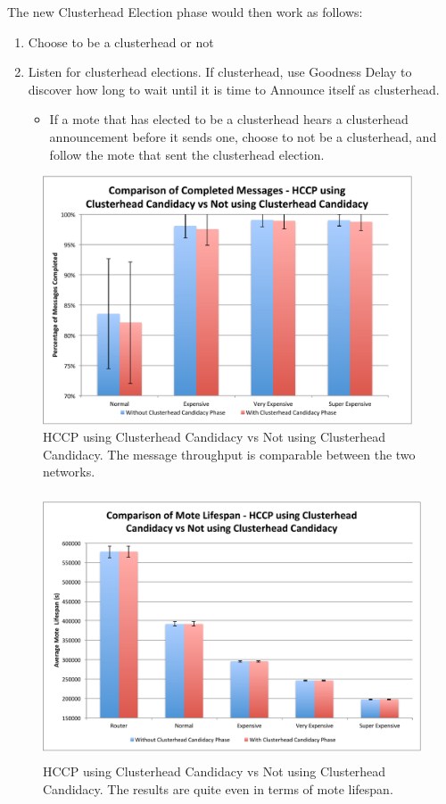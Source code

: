 The new Clusterhead Election phase would then work as follows: 
\begin{enumerate}
    \item Choose to be a clusterhead or not
    \item Listen for clusterhead elections. If clusterhead, use Goodness Delay to discover how long to wait until it is time to Announce itself as clusterhead.
    \begin{itemize}
        \item If a mote that has elected to be a clusterhead hears a clusterhead announcement before it sends one, choose to not be a clusterhead, and follow the mote that sent the clusterhead election.
    \end{itemize}
\end{enumerate}


\begin{figure}[htbp]
    \centering
        \includegraphics[height=2.9in]{images/ccVsNo/messages.pdf}
    \caption{ HCCP using Clusterhead Candidacy vs Not using Clusterhead Candidacy. The message throughput is comparable between the two networks.}
    \label{fig:images_ccVsNo_messages}
\end{figure}
\begin{figure}[htbp]
    \centering
        \includegraphics[height=3.1in]{images/ccVsNo/lifespan.pdf}
    \caption{HCCP using Clusterhead Candidacy vs Not using Clusterhead Candidacy. The results are quite even in terms of mote lifespan.}
    \label{fig:images_ccVsNo_lifespan}
\end{figure}


